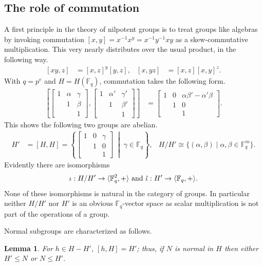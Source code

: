 \documentclass[11pt]{article}
\numberwithin{equation}{section}
\theoremstyle{definition}
\theoremstyle{plain}
\numberwithin{equation}{section}
\theoremstyle{plain}       %
\newtheorem{lem}[equation]{Lemma}
\theoremstyle{remark}
\theoremstyle{definition}
\numberwithin{figure}{section}
\numberwithin{table}{section}
\newcommand{\bbF}{\mathbb{F}}  %
\begin{document}
\subsection{The role of commutation}
A first principle in the theory of nilpotent groups is to treat groups like
algebras by invoking commutation $[x,y]=x^{-1}x^y=x^{-1}y^{-1}xy$ as a
skew-commutative multiplication.  This very nearly distributes over the usual
product, in the following way.
\begin{align}\label{eq:comm-id}
	[xy,z] & = [x,z]^y [y,z], & [x,yz] & = [x,z][x,y]^z.
\end{align}
With $q=p^e$ and $H=H(\bbF_q)$, commutation takes the following form.
\begin{align}\label{eq:comm-H}
	\left[
	\begin{bmatrix}
	1 & \alpha & \gamma\\ & 1 & \beta\\ & & 1 
	\end{bmatrix},
	\begin{bmatrix}
	1 & \alpha' & \gamma'\\ & 1 & \beta'\\ & & 1 
	\end{bmatrix}
	\right] 
	& = 
	\begin{bmatrix}
	1 & 0 & \alpha \beta'-\alpha'\beta\\ & 1 & 0\\ & & 1 
	\end{bmatrix}.
\end{align}
This shows the following two groups are abelian.
\begin{align*}
	H' & = [H,H] =\left\{ 
		\begin{bmatrix} 1 & 0 & \gamma\\ & 1 & 0\\ & & 1 \end{bmatrix} 
	\;\middle|\; \gamma \in\bbF_{q}\right\}, & H/H'\cong \{(\alpha,\beta) \mid 
	\alpha,\beta\in \bbF_q^m\}.
\end{align*}
Evidently there are isomorphisms 
\begin{align}\label{def:iota}
	\iota:H/H'\to \langle \bbF_q^2,+\rangle\textnormal{ and }
	\hat{\iota}:H'\to \langle\bbF_q,+\rangle.
\end{align}
None of these isomorphisms is natural in the category of groups.  In particular
neither $H/H'$ nor $H'$ is an obvious $\bbF_q$-vector space as scalar
multiplication is not part of the operations of a group.  

Normal subgroups are characterized as follows.
\begin{lem}\label{lem:quo}
For $h\in H-H'$, $[h,H]=H'$; thus, if $N$ is normal in $H$ then either $H'\leq N$ or $N\leq H'$. 
\end{lem}
\end{document}
